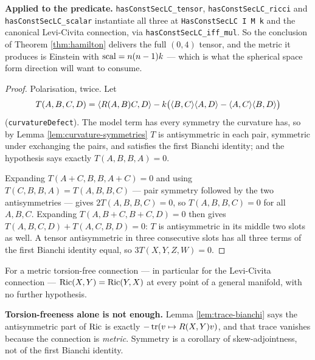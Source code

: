 \begin{lemma}
  \textbf{Applied to the predicate.} \texttt{hasConstSecLC\_tensor},
  \texttt{hasConstSecLC\_ricci} and \texttt{hasConstSecLC\_scalar} instantiate
  all three at \texttt{HasConstSecLC I M k} and the canonical Levi-Civita
  connection, via \texttt{hasConstSecLC\_iff\_mul}. So the conclusion of
  Theorem \ref{thm:hamilton} delivers the full $(0,4)$ tensor, and the metric it
  produces is Einstein with $\operatorname{scal} = n(n-1)k$ --- which is what the spherical
  space form direction will want to consume.
\end{lemma}

\begin{proof}
  \leanok
  Polarisation, twice. Let
  \[
    T(A,B,C,D) = \langle R(A,B)C, D\rangle
      - k\big(\langle B,C\rangle\langle A,D\rangle
             - \langle A,C\rangle\langle B,D\rangle\big)
  \]
  (\texttt{curvatureDefect}). The model term has every symmetry the curvature
  has, so by Lemma \ref{lem:curvature-symmetries} $T$ is antisymmetric in each
  pair, symmetric under exchanging the pairs, and satisfies the first Bianchi
  identity; and the hypothesis says exactly $T(A,B,B,A) = 0$.

  Expanding $T(A+C, B, B, A+C) = 0$ and using $T(C,B,B,A) = T(A,B,B,C)$ --- pair
  symmetry followed by the two antisymmetries --- gives $2T(A,B,B,C) = 0$, so
  $T(A,B,B,C) = 0$ for all $A,B,C$. Expanding $T(A, B+C, B+C, D) = 0$ then gives
  $T(A,B,C,D) + T(A,C,B,D) = 0$: $T$ is antisymmetric in its middle two slots as
  well. A tensor antisymmetric in three consecutive slots has all three terms of
  the first Bianchi identity equal, so $3T(X,Y,Z,W) = 0$.
\end{proof}

\begin{theorem}
  \label{thm:ricci-symm}
  \leanok
  For a metric torsion-free connection --- in particular for the Levi-Civita
  connection --- $\operatorname{Ric}(X,Y) = \operatorname{Ric}(Y,X)$ at every point of a general manifold,
  with no further hypothesis.

  \textbf{Torsion-freeness alone is not enough.} Lemma \ref{lem:trace-bianchi}
  says the antisymmetric part of $\operatorname{Ric}$ is exactly $-\operatorname{tr}(v \mapsto
  R(X,Y)v)$, and that trace vanishes because the connection is \emph{metric}.
  Symmetry is a corollary of skew-adjointness, not of the first Bianchi identity.
\end{theorem}


